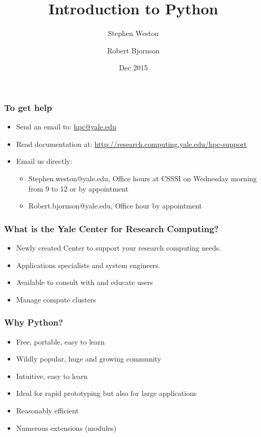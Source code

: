 \documentclass[10pt]{beamer}
\title{Introduction to Python}
\author{{Stephen Weston} \and {Robert Bjornson}}
\institute[Yale]{
  Yale Center for Research Computing \\
  Yale University
}
\date{Dec 2015}
\begin{document}
\begin{frame}[plain]
  \titlepage
\end{frame}

\begin{frame}
\frametitle{To get help}
\begin{itemize}
\item Send an email to: \url{hpc@yale.edu}
\item Read documentation at: \url{http://research.computing.yale.edu/hpc-support}
\item Email us directly:
\begin{itemize}
\item Stephen.weston@yale.edu, Office hours at CSSSI on Wednesday morning from 9 to 12 or by appointment
\item Robert.bjornson@yale.edu, Office hour by appointment
\end{itemize}
\end{itemize}
\end{frame}

\begin{frame}
\frametitle{What is the Yale Center for Research Computing?}

\begin{itemize}
\item Newly created Center to support your research computing needs.
\item Applications specialists and system engineers.
\item Available to consult with and educate users
\item Manage compute clusters
\end{itemize}
\end{frame}

\begin{frame}
\frametitle{Why Python?}

\begin{itemize}
\item Free, portable, easy to learn
\item Wildly popular, huge and growing community
\item Intuitive, easy to learn
\item Ideal for rapid prototyping but also for large applications
\item Reasonably efficient
\item Numerous extensions (modules)
\end{itemize}
\end{frame}
\end{document}

